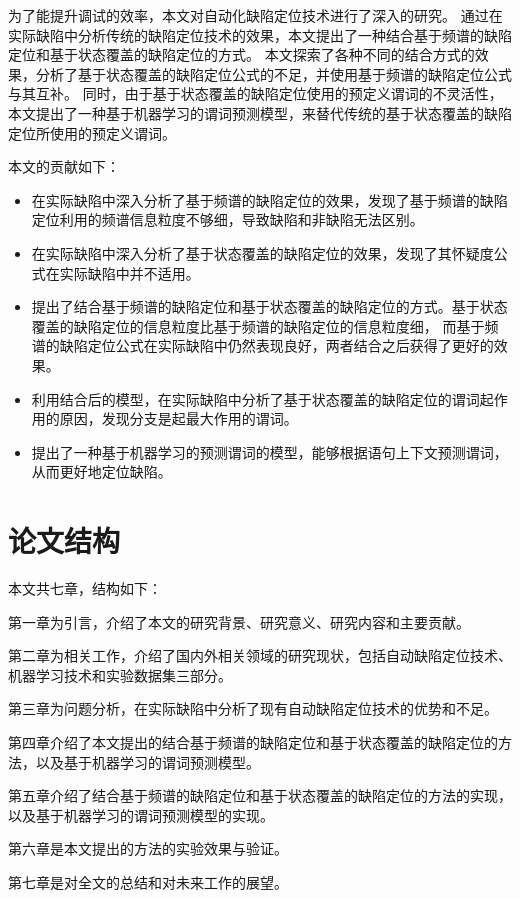 为了能提升调试的效率，本文对自动化缺陷定位技术进行了深入的研究。
通过在实际缺陷中分析传统的缺陷定位技术的效果，本文提出了一种结合基于频谱的缺陷定位和基于状态覆盖的缺陷定位的方式。
本文探索了各种不同的结合方式的效果，分析了基于状态覆盖的缺陷定位公式的不足，并使用基于频谱的缺陷定位公式与其互补。
同时，由于基于状态覆盖的缺陷定位使用的预定义谓词的不灵活性，
本文提出了一种基于机器学习的谓词预测模型，来替代传统的基于状态覆盖的缺陷定位所使用的预定义谓词。

本文的贡献如下：
\begin{itemize}
\item 在实际缺陷中深入分析了基于频谱的缺陷定位的效果，发现了基于频谱的缺陷定位利用的频谱信息粒度不够细，导致缺陷和非缺陷无法区别。
\item 在实际缺陷中深入分析了基于状态覆盖的缺陷定位的效果，发现了其怀疑度公式在实际缺陷中并不适用。
\item 提出了结合基于频谱的缺陷定位和基于状态覆盖的缺陷定位的方式。基于状态覆盖的缺陷定位的信息粒度比基于频谱的缺陷定位的信息粒度细，
而基于频谱的缺陷定位公式在实际缺陷中仍然表现良好，两者结合之后获得了更好的效果。
\item 利用结合后的模型，在实际缺陷中分析了基于状态覆盖的缺陷定位的谓词起作用的原因，发现分支是起最大作用的谓词。
\item 提出了一种基于机器学习的预测谓词的模型，能够根据语句上下文预测谓词，从而更好地定位缺陷。
\end{itemize}

\section{论文结构}

本文共七章，结构如下：

第一章为引言，介绍了本文的研究背景、研究意义、研究内容和主要贡献。

第二章为相关工作，介绍了国内外相关领域的研究现状，包括自动缺陷定位技术、机器学习技术和实验数据集三部分。

第三章为问题分析，在实际缺陷中分析了现有自动缺陷定位技术的优势和不足。

第四章介绍了本文提出的结合基于频谱的缺陷定位和基于状态覆盖的缺陷定位的方法，以及基于机器学习的谓词预测模型。

第五章介绍了结合基于频谱的缺陷定位和基于状态覆盖的缺陷定位的方法的实现，以及基于机器学习的谓词预测模型的实现。

第六章是本文提出的方法的实验效果与验证。

第七章是对全文的总结和对未来工作的展望。

